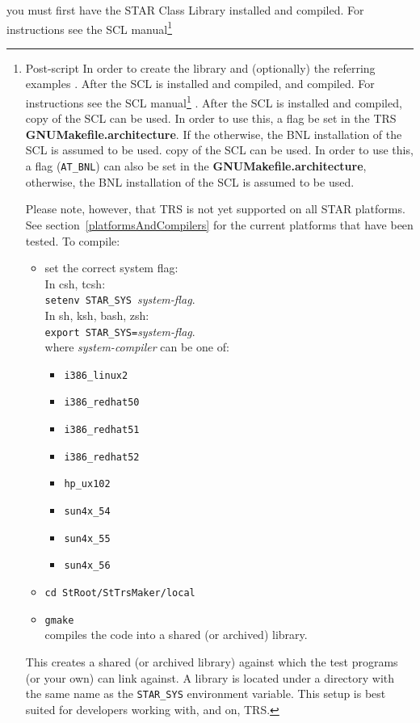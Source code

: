 \documentclass[twoside]{article}
\newcommand{\name}[1]{\textsf{#1}}%
\newcommand{\comp}[1]{\texttt{#1}}%
\newcommand{\args}[1]{\textit{#1}}%
\begin{document}
you must first have the STAR Class Library  installed
and compiled.  For instructions see the SCL manual\footnote{Post-script
In order to create the library and (optionally) the referring examples
.  After the SCL is installed and compiled,
and compiled.  For instructions see the \name{SCL} manual\footnote{Post-script
  version available at http://star.physics.yale.edu/SCL}
.  After the \name{SCL} is installed and compiled,
copy of the SCL can be used.  In order to use this, a flag
be set in the \name{TRS} {\bf GNUMakefile.architecture}.  If the
otherwise, the BNL installation of the SCL is assumed to be used.
copy of the \name{SCL} can be used.  In order to use this, a flag
(\texttt{AT\_BNL}) can also be set in the {\bf GNUMakefile.architecture},
otherwise, the BNL installation of the \name{SCL} is assumed to be used.

Please note, however, that \name{TRS} is not yet supported
on all STAR platforms.
See section~\ref{platformsAndCompilers} for the current platforms that have
been tested.  To compile:

\begin{itemize}
  \item set the correct system flag:\\
    In \name{csh, tcsh}:\\
    \comp{setenv STAR\_SYS}\ \args{system-flag}.\\
    In \name{sh, ksh, bash, zsh}:\\
    \comp{export STAR\_SYS=}\args{system-flag}.\\
    where \args{system-compiler} can be one of:
    \begin{itemize}
    \item \comp{i386\_linux2}
    \item \comp{i386\_redhat50}
    \item \comp{i386\_redhat51}
    \item \comp{i386\_redhat52}
    \item \comp{hp\_ux102}
    \item \comp{sun4x\_54}
    \item \comp{sun4x\_55}
    \item \comp{sun4x\_56}
    \end{itemize}
  \item \comp{cd StRoot/StTrsMaker/local}
  \item \comp{gmake} \\ compiles the code into a shared (or archived) library.
\end{itemize}
This creates a shared (or archived library) against which the test
programs (or your own) can link against.  A library is located 
under a directory with the same name as the
\comp{STAR\_SYS} environment variable. This setup is best suited for
developers working with, and on, \name{TRS}.

}
\end{document}
